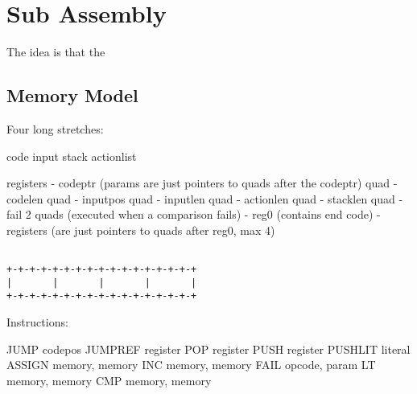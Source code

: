 \section{Sub Assembly}

The idea is that the 

\subsection{Memory Model}

Four long stretches:

code
input
stack
actionlist

registers
- codeptr (params are just pointers to quads after the codeptr) quad
- codelen quad
- inputpos quad
- inputlen quad
- actionlen quad
- stacklen quad
- fail 2 quads (executed when a comparison fails)
- reg0 (contains end code)
- registers (are just pointers to quads after reg0, max 4)


\begin{verbatim}

+-+-+-+-+-+-+-+-+-+-+-+-+-+-+-+-+
|       |       |       |       |
+-+-+-+-+-+-+-+-+-+-+-+-+-+-+-+-+

\end{verbatim}

Instructions:

JUMP codepos
JUMPREF register
POP register
PUSH register
PUSHLIT literal
ASSIGN memory, memory
INC memory, memory
FAIL opcode, param
LT memory, memory
CMP memory, memory
